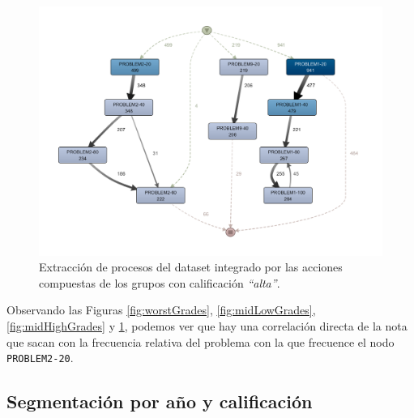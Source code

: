 \begin{figure}[H]
    \centering
    \includegraphics[width=1.25\textwidth]{imagenes/DISCO_compound/BestGrades.png}
    \caption{Extracción de procesos del dataset integrado por las acciones compuestas de los grupos con calificación \emph{``alta''}.}
    \label{fig:bestGrades}
\end{figure}

Observando las Figuras \ref{fig:worstGrades}, \ref{fig:midLowGrades}, \ref{fig:midHighGrades} y \ref{fig:bestGrades}, podemos ver que hay una correlación directa de la nota que sacan con la frecuencia relativa del problema con la que frecuence el nodo \texttt{PROBLEM2-20}.

\subsection{Segmentación por año y calificación}

